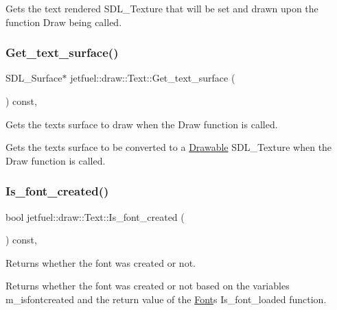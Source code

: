 Gets the text rendered S\+D\+L\+\_\+\+Texture that will be set and drawn upon the function Draw being called. \mbox{\label{classjetfuel_1_1draw_1_1Text_ab1b5195b8431f794aad7156583992dc9}} 
\subsubsection{\texorpdfstring{Get\+\_\+text\+\_\+surface()}{Get\_text\_surface()}}
{\footnotesize\ttfamily S\+D\+L\+\_\+\+Surface$\ast$ jetfuel\+::draw\+::\+Text\+::\+Get\+\_\+text\+\_\+surface (\begin{DoxyParamCaption}{ }\end{DoxyParamCaption}) const\hspace{0.3cm}{\ttfamily [inline]}, {\ttfamily [protected]}}



Gets the text\textquotesingle{}s surface to draw when the Draw function is called. 

Gets the text\textquotesingle{}s surface to be converted to a \hyperlink{classjetfuel_1_1draw_1_1Drawable}{Drawable} S\+D\+L\+\_\+\+Texture when the Draw function is called. \mbox{\label{classjetfuel_1_1draw_1_1Text_a179a3fb69ac28cba38a6fbfe541e175b}} 
\subsubsection{\texorpdfstring{Is\+\_\+font\+\_\+created()}{Is\_font\_created()}}
{\footnotesize\ttfamily bool jetfuel\+::draw\+::\+Text\+::\+Is\+\_\+font\+\_\+created (\begin{DoxyParamCaption}{ }\end{DoxyParamCaption}) const\hspace{0.3cm}{\ttfamily [inline]}, {\ttfamily [protected]}}



Returns whether the font was created or not. 

Returns whether the font was created or not based on the variables m\+\_\+isfontcreated and the return value of the \hyperlink{classjetfuel_1_1draw_1_1Font}{Font}\textquotesingle{}s Is\+\_\+font\+\_\+loaded function. \mbox{\label{classjetfuel_1_1draw_1_1Text_a007454f20452791fe80f981e45fab1d7}} 

